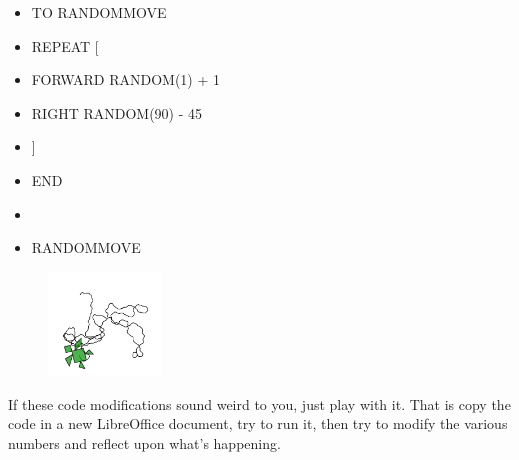\begin{scriptsize}
\begin{minipage}{0.50\textwidth}
\begin{itemize}[itemsep=-3pt,parsep=2pt, leftmargin=-0.0mm ]
\item[] TO RANDOMMOVE
\item[] \hspace{8pt} 	REPEAT [ 
\item[] \hspace{8pt}\hspace{8pt}		FORWARD RANDOM(1) + 1 
\item[] \hspace{8pt}\hspace{8pt}		RIGHT RANDOM(90) - 45
\item[] \hspace{8pt}	]
\item[] END                            
\item[] 
\item[] RANDOMMOVE
\end{itemize}
\end{minipage}
\end{scriptsize}
\begin{minipage}{0.5\textwidth}
\begin{figure}[H]
   \includegraphics[width=3.0cm,trim=4 4 8 4,clip]{./images/caos-della-vita/caos-della-vita-2.png}
   \label{dec-2}
\end{figure}
\end{minipage} \hfill

\vskip 1cm

If these code modifications sound weird to you, just play with it. That is copy the code in a new LibreOffice document, try to run it, then try to modify the various numbers and reflect upon what's happening. 

